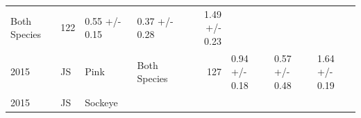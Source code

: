 \documentclass[fleqn,10pt]{wlpeerj} %
\begin{document}
\begin{longtable}[]{@{}llllrlll@{}}
\begin{minipage}[t]{0.11\columnwidth}
Both Species\strut
\end{minipage} & \begin{minipage}[t]{0.04\columnwidth}\raggedleft\strut
122\strut
\end{minipage} & \begin{minipage}[t]{0.14\columnwidth}\raggedright\strut
0.55 +/- 0.15\strut
\end{minipage} & \begin{minipage}[t]{0.14\columnwidth}\raggedright\strut
0.37 +/- 0.28\strut
\end{minipage} & \begin{minipage}[t]{0.14\columnwidth}\raggedright\strut
1.49 +/- 0.23\strut
\end{minipage}\tabularnewline
\begin{minipage}[t]{0.09\columnwidth}\raggedright\strut
2015\strut
\end{minipage} & \begin{minipage}[t]{0.06\columnwidth}\raggedright\strut
JS\strut
\end{minipage} & \begin{minipage}[t]{0.06\columnwidth}\raggedright\strut
Pink\strut
\end{minipage} & \begin{minipage}[t]{0.11\columnwidth}\raggedright\strut
Both Species\strut
\end{minipage} & \begin{minipage}[t]{0.04\columnwidth}\raggedleft\strut
127\strut
\end{minipage} & \begin{minipage}[t]{0.14\columnwidth}\raggedright\strut
0.94 +/- 0.18\strut
\end{minipage} & \begin{minipage}[t]{0.14\columnwidth}\raggedright\strut
0.57 +/- 0.48\strut
\end{minipage} & \begin{minipage}[t]{0.14\columnwidth}\raggedright\strut
1.64 +/- 0.19\strut
\end{minipage}\tabularnewline
\begin{minipage}[t]{0.09\columnwidth}\raggedright\strut
2015\strut
\end{minipage} & \begin{minipage}[t]{0.06\columnwidth}\raggedright\strut
JS\strut
\end{minipage} & \begin{minipage}[t]{0.06\columnwidth}\raggedright\strut
Sockeye\strut
\end{minipage} & \begin{minipage}[t]{0.11\columnwidth}\raggedright\strut

\end{minipage}
\end{longtable}
\end{document}
